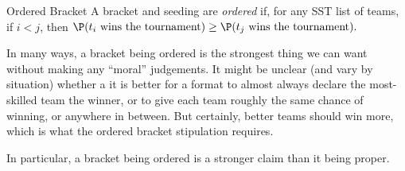 {\begin{definition}{Ordered Bracket}{}
    A bracket and seeding are \textit{ordered} if, for any SST list of teams, if $i < j$, then $\P(t_i\textrm{ wins the tournament} )\geq \P(t_j\textrm{ wins the tournament}).$
\end{definition}

In many ways, a bracket being ordered is the strongest thing we can want without making any ``moral'' judgements. It might be unclear (and vary by situation) whether a it is better for a format to almost always declare the most-skilled team the winner, or to give each team roughly the same chance of winning, or anywhere in between. But certainly, better teams should win more, which is what the ordered bracket stipulation requires.

In particular, a bracket being ordered is a stronger claim than it being proper.
}
